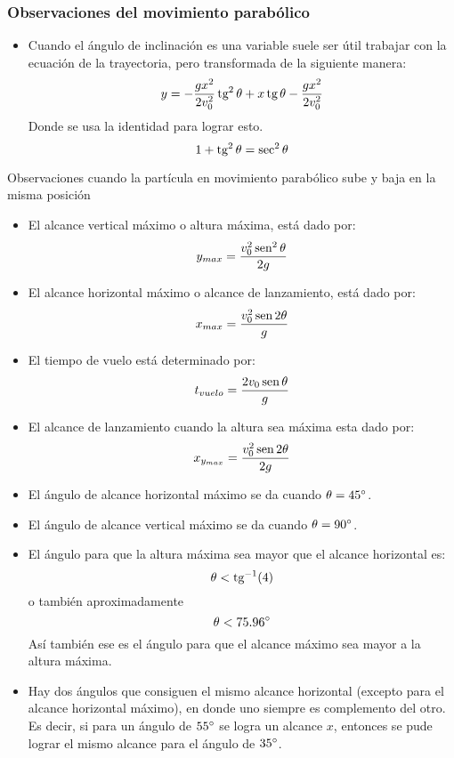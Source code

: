 \subsubsection*{Observaciones del movimiento parabólico}
\begin{itemize}
	\item Cuando el ángulo de inclinación es una variable suele ser útil trabajar con la ecuación de la trayectoria, pero transformada de la siguiente manera:
	$$ y=-\frac{gx^2}{2v_0^2}\mathop{\mbox{\normalfont tg}}\nolimits^2 \theta + x\mathop{\mbox{\normalfont tg}}\nolimits \theta - \frac{gx^2}{2v_0^2} $$
	Donde se usa la identidad para lograr esto.
	$$ 1+\mathop{\mbox{\normalfont tg}}\nolimits^2\theta=\sec^2\theta $$
\end{itemize}
Observaciones cuando la partícula en movimiento parabólico sube y baja en la misma posición
\begin{itemize}
	\item El alcance vertical máximo o altura máxima, está dado por:
	$$ y_{max}=\frac{v_0^2\mathop{\mbox{\normalfont sen}}\nolimits^2\theta}{2g} $$
	\item El alcance horizontal máximo o alcance de lanzamiento, está dado por:
	$$ x_{max}=\frac{v_0^2\mathop{\mbox{\normalfont sen}}\nolimits2\theta}{g} $$
	\item El tiempo de vuelo está determinado por:
	$$ t_{vuelo}=\frac{2v_0\mathop{\mbox{\normalfont sen}}\nolimits\theta}{g} $$
	\item El alcance de lanzamiento cuando la altura sea máxima esta dado por:
	$$ x_{y_{max}}=\frac{v_0^2\mathop{\mbox{\normalfont sen}}\nolimits2\theta}{2g} $$
	\item El ángulo de alcance horizontal máximo se da cuando $\theta=45 \degree$.
	\item El ángulo de alcance vertical máximo se da cuando $\theta=90\degree$.
	\item El ángulo para que la altura máxima sea mayor que el alcance horizontal es: $$ \theta<\mathop{\mbox{\normalfont tg}}\nolimits^{-1}(4) $$ o también aproximadamente $$ \theta<75.96\degree $$Así también ese es el ángulo para que el alcance máximo sea mayor a la altura máxima.
	\item Hay dos ángulos que consiguen el mismo alcance horizontal (excepto para el alcance horizontal máximo), en donde uno siempre es complemento del otro. Es decir, si para un ángulo de $55\degree$ se logra un alcance $x$, entonces se pude lograr el mismo alcance para el ángulo de $35\degree$.
\end{itemize}
